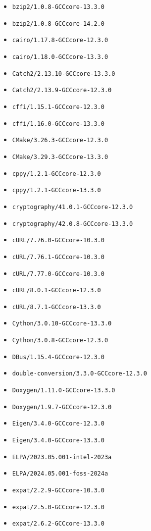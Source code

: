 \begin{multicols}{3}
\begin{itemize}
\item \verb|bzip2/1.0.8-GCCcore-13.3.0|
\item \verb|bzip2/1.0.8-GCCcore-14.2.0|
\item \verb|cairo/1.17.8-GCCcore-12.3.0|
\item \verb|cairo/1.18.0-GCCcore-13.3.0|
\item \verb|Catch2/2.13.10-GCCcore-13.3.0|
\item \verb|Catch2/2.13.9-GCCcore-12.3.0|
\item \verb|cffi/1.15.1-GCCcore-12.3.0|
\item \verb|cffi/1.16.0-GCCcore-13.3.0|
\item \verb|CMake/3.26.3-GCCcore-12.3.0|
\item \verb|CMake/3.29.3-GCCcore-13.3.0|
\item \verb|cppy/1.2.1-GCCcore-12.3.0|
\item \verb|cppy/1.2.1-GCCcore-13.3.0|
\item \verb|cryptography/41.0.1-GCCcore-12.3.0|
\item \verb|cryptography/42.0.8-GCCcore-13.3.0|
\item \verb|cURL/7.76.0-GCCcore-10.3.0|
\item \verb|cURL/7.76.1-GCCcore-10.3.0|
\item \verb|cURL/7.77.0-GCCcore-10.3.0|
\item \verb|cURL/8.0.1-GCCcore-12.3.0|
\item \verb|cURL/8.7.1-GCCcore-13.3.0|
\item \verb|Cython/3.0.10-GCCcore-13.3.0|
\item \verb|Cython/3.0.8-GCCcore-12.3.0|
\item \verb|DBus/1.15.4-GCCcore-12.3.0|
\item \verb|double-conversion/3.3.0-GCCcore-12.3.0|
\item \verb|Doxygen/1.11.0-GCCcore-13.3.0|
\item \verb|Doxygen/1.9.7-GCCcore-12.3.0|
\item \verb|Eigen/3.4.0-GCCcore-12.3.0|
\item \verb|Eigen/3.4.0-GCCcore-13.3.0|
\item \verb|ELPA/2023.05.001-intel-2023a|
\item \verb|ELPA/2024.05.001-foss-2024a|
\item \verb|expat/2.2.9-GCCcore-10.3.0|
\item \verb|expat/2.5.0-GCCcore-12.3.0|
\item \verb|expat/2.6.2-GCCcore-13.3.0|

\end{itemize}
\end{multicols}
